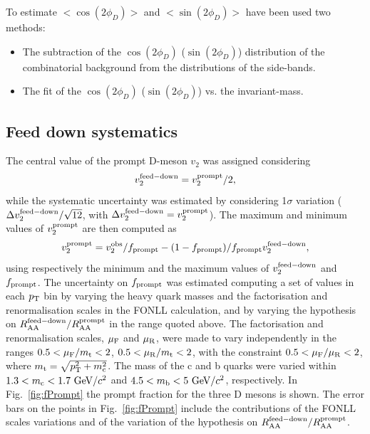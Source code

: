 To estimate $< \cos(2\phi_D) >$ and $< \sin(2\phi_D) >$ 
have been used two methods:
\begin{itemize}
\item The subtraction of the $\cos(2\phi_D)$ ($\sin(2\phi_D)$) 
distribution of the combinatorial background from the distributions of the side-bands.
\item The fit of the $\cos(2\phi_D)$ ($\sin(2\phi_D)$) vs. the invariant-mass.
\end{itemize}

\subsection{Feed down systematics}
\label{FDsystV2}
The central value of the prompt D-meson $v_2$ was assigned considering 
\begin{equation}
v_2^{\rm feed-down}=v_2^{\rm prompt}/2,
\end{equation}
while the systematic uncertainty was 
estimated by considering 1$\sigma$ variation ($\Delta v_2^{\rm feed-down}/\sqrt{12}$, with 
$\Delta v_2^{\rm feed-down} = v_2^{\rm prompt}$). 
The maximum and minimum values of $v_2^{\rm prompt}$ are then computed as
\begin{equation}
v_{2}^{\rm prompt}=v_{2}^{\rm obs}/f_{\rm prompt} - (1-f_{\rm prompt})/f_{\rm prompt}v_{2}^{\rm feed-down},
\end{equation} 
using respectively the minimum and the maximum values 
of $v_{\rm 2}^{\rm feed-down}$ and $f_{\rm prompt}$. 
The uncertainty on $f_{\rm prompt}$ was estimated 
computing a set of values in each $p_{\rm T}$ bin by
varying the heavy quark masses and the factorisation and renormalisation 
scales in the FONLL calculation, and by varying the hypothesis 
on $R_{\rm AA}^{\rm feed-down}/R_{\rm AA}^{\rm prompt}$ in the range quoted above.
The factorisation and renormalisation 
scales, $\mu_{\rm F}$ and $\mu_{\rm R}$, were made to vary independently 
in the ranges $0.5<\mu_{\rm F}/m_{\rm t}<2$, $0.5<\mu_{\rm R}/m_{\rm t}<2$, 
with the constraint $0.5<\mu_{\rm F}/\mu_{\rm R}<2$, 
where $m_{\rm t}=\sqrt{p_{\rm T}^2+m_{\rm c}^2}$.
The mass of the c and b quarks were varied within $1.3<m_{\rm c}<1.7~\mathrm{GeV}/c^2$ 
and $4.5<m_{\rm b}<5~\mathrm{GeV}/c^2$, respectively.
In Fig.~\ref{fig:fPrompt} the prompt fraction for the three D mesons is shown.
The error bars on the points in Fig.~\ref{fig:fPrompt} include the
contributions of the FONLL scales variations and of the variation of
the hypothesis on $R_{\rm AA}^{\rm feed-down}/R_{\rm AA}^{\rm prompt}$.

